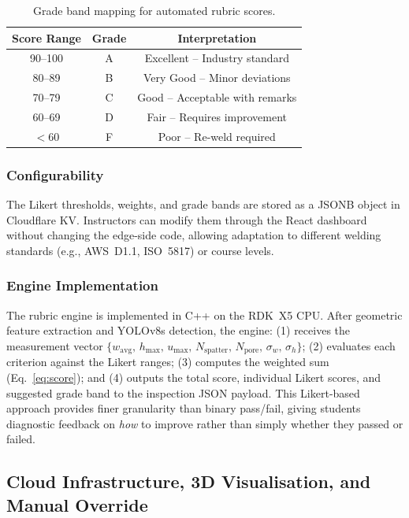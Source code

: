 \documentclass[12pt,a4paper]{article}
\begin{document}
\begin{table}[htbp]
  \centering
  \caption{Grade band mapping for automated rubric scores.}
  \label{tab:grades}
  \begin{tabular}{ccc}
    \toprule
    \textbf{Score Range} & \textbf{Grade} & \textbf{Interpretation} \\
    \midrule
    90--100 & A & Excellent -- Industry standard \\
    80--89  & B & Very Good -- Minor deviations \\
    70--79  & C & Good -- Acceptable with remarks \\
    60--69  & D & Fair -- Requires improvement \\
    $<$60   & F & Poor -- Re-weld required \\
    \bottomrule
  \end{tabular}
\end{table}

\subsubsection*{Configurability}
The Likert thresholds, weights, and grade bands are stored as a JSONB object in Cloudflare KV. Instructors
can modify them through the React dashboard without changing the edge-side code, allowing adaptation to
different welding standards (e.g., AWS~D1.1, ISO~5817) or course levels.

\subsubsection*{Engine Implementation}
The rubric engine is implemented in C++ on the RDK~X5 CPU. After geometric feature extraction and YOLOv8s
detection, the engine: (1) receives the measurement vector
$\{w_\text{avg},\, h_\text{max},\, u_\text{max},\, N_\text{spatter},\, N_\text{pore},\, \sigma_w,\, \sigma_h\}$;
(2) evaluates each criterion against the Likert ranges; (3) computes the weighted sum (Eq.~\ref{eq:score});
and (4) outputs the total score, individual Likert scores, and suggested grade band to the inspection JSON
payload. This Likert-based approach provides finer granularity than binary pass/fail, giving students
diagnostic feedback on \textit{how} to improve rather than simply whether they passed or failed.

\subsection{Cloud Infrastructure, 3D Visualisation, and Manual Override}
\end{document}

